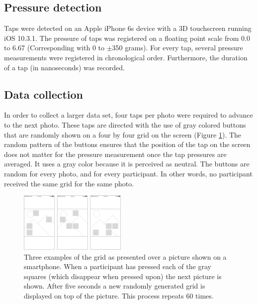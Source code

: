 \documentclass{sigchi}
\begin{document}

\subsection{Pressure detection} %
\label{sub:pressure_detection}
Taps were detected on an Apple iPhone 6s device with a 3D touchscreen running iOS 10.3.1. The pressure of taps was registered on a floating point scale from 0.0 to 6.67 (Corresponding with 0 to $\pm$350 grams). For every tap, several pressure measurements were registered in chronological order. Furthermore, the duration of a tap (in nanoseconds) was recorded.

\subsection{Data collection} %
\label{sub:data_collection}
In order to collect a larger data set, four taps per photo were required to advance to the next photo. These taps are directed with the use of gray colored buttons that are randomly shown on a four by four grid on the screen (Figure \ref{fig:grid}). The random pattern of the buttons ensures that the position of the tap on the screen does not matter for the pressure measurement once the tap pressures are averaged. It uses a gray color because it is perceived as neutral. The buttons are random for every photo, and for every participant. In other words, no participant received the same grid for the same photo.
\begin{figure}[t]
    \centering
    \includegraphics[width=0.46\textwidth]{images/Grid.eps}
    \caption{Three examples of the grid as presented over a picture shown on a smartphone. When a participant has pressed each of the gray squares (which disappear when pressed upon) the next picture is shown. After five seconds a new randomly generated grid is displayed on top of the picture. This process repeats 60 times.}
    \label{fig:grid}
\end{figure}
\end{document}
